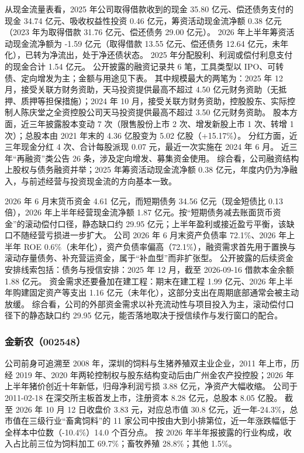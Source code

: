  从现金流量表看，2025 年公司取得借款收到的现金 35.80 亿元、偿还债务支付的现金 34.74 亿元、吸收权益性投资 0.46 亿元，筹资活动现金流净额 0.38 亿元（2023 年为取得借款 31.76 亿元、偿还债务 29.00 亿元）。 2026 年上半年筹资活动现金流净额为 -1.59 亿元（取得借款 13.55 亿元、偿还债务 12.64 亿元，未年化），已转为净流出，处于净还债状态。 2025 年分配股利、利润或偿付利息支付的现金合计 1.54 亿元。 公开披露的融资记录共 6 笔，工具类型以 IPO、可转债、定向增发为主；金额与用途见下表。 其中规模最大的两笔为：2025 年 12 月，接受关联方财务资助，天马投资提供最高不超过 4.50 亿元财务资助（无抵押、质押等担保措施）；2024 年 10 月，接受关联方财务资助，控股股东、实际控制人陈庆堂之全资控股公司天马投资提供最高不超过 3.50 亿元财务资助。 股本方面，近三年披露股本变动 7 次（限售股份上市 2 次、增发新股上市 1 次、转增 1 次）；总股本由 2021 年末的 4.36 亿股变为 5.02 亿股（+15.17\%）。 分红方面，近三年现金分红 4 次、合计每股派现 0.07 元，最近一次实施在 2024 年 6 月。 近三年“再融资”类公告 26 条，涉及定向增发、募集资金使用。 综合看，公司融资结构上股权与债务融资并举；2025 年筹资活动现金流净额 0.38 亿元，年度内仍为净融入，与前述经营与投资现金流的方向基本一致。

 2026 年 6 月末货币资金 4.61 亿元，而短期债务 34.56 亿元（现金短债比 0.13 倍），2026 年上半年经营现金流净额 1.87 亿元。按“短期债务减去账面货币资金”的滚动偿付口径，静态缺口约 29.95 亿元；上半年盈利或接近盈亏平衡，该缺口不随经营亏损进一步扩大。 公司 2026 年 6 月末资产负债率 72.1\%、2026 年上半年 ROE 0.6\%（未年化），资产负债率偏高（72.1\%），融资需求首先用于置换与滚动存量债务、补充营运资金，属于“补血型”而非扩张型。 公开披露的后续资金安排线索包括：债务与授信安排：2025 年 12 月，截至 2026-09-16 借款本金余额 1.88 亿元。 资金需求还要叠加在建工程：期末在建工程 1.99 亿元、2026 年上半年购建固定资产等支出 1.16 亿元（未年化），这部分支出在周期底部通常会被主动放缓。 综合看，公司的外部资金需求以补充流动性与项目投入为主，滚动偿付口径下的静态缺口约 29.95 亿元，能否落地取决于授信续作与发行窗口的配合。




\subsubsection{金新农（002548）}
\label{co:002548}

 公司前身可追溯至 2008 年，深圳的饲料与生猪养殖双主业企业，2011 年上市，历经 2019 年、2020 年两轮控制权与股东结构变动后由广州金农产投控股；2026 年上半年猪价创近十年新低，归母净利润亏损 3.88 亿元，净资产大幅收缩。 公司于 2011-02-18 在深交所主板首发上市，注册资本 8.28 亿元，总股本 8.05 亿股。 截至 2026 年 10 月 12 日收盘价 3.83 元，对应总市值 30.8 亿元，近一年-24.3\%，总市值在三级行业“畜禽饲料”的 11 家公司中按由大到小排第位，近一年涨跌幅低于全样本中位数（-10.4\%）14.0 个百分点。 按 2026 年半年报披露的行业构成，收入占比前三位为饲料加工 69.7\%；畜牧养殖 28.8\%；其他 1.5\%。

